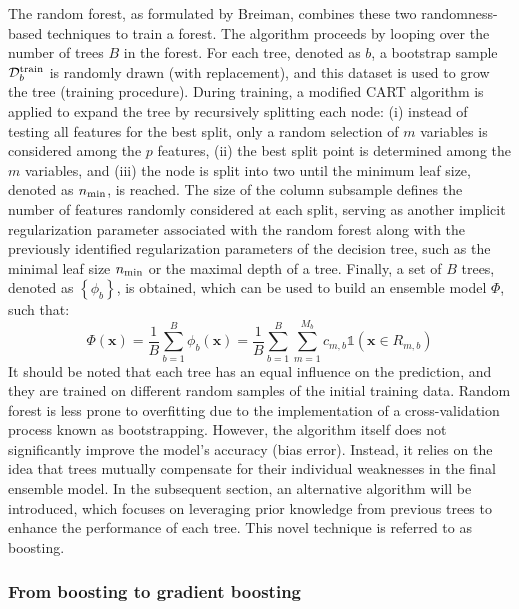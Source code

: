\documentclass[main]{subfiles}
\begin{document}
The random forest, as formulated by Breiman, combines these two randomness-based techniques to train a forest.\autocite{Breiman_2001} The algorithm proceeds by looping over the number of trees $B$ in the forest. For each tree, denoted as $b$, a bootstrap sample $\mathcal{D}^{\text{train}}_b$ is randomly drawn (with replacement), and this dataset is used to grow the tree (training procedure). During training, a modified CART algorithm is applied to expand the tree by recursively splitting each node: (i) instead of testing all features for the best split, only a random selection of $m$ variables is considered among the $p$ features, (ii) the best split point is determined among the $m$ variables, and (iii) the node is split into two until the minimum leaf size, denoted as $n_{\text{min}}$, is reached. The size of the column subsample defines the number of features randomly considered at each split, serving as another implicit regularization parameter associated with the random forest along with the previously identified regularization parameters of the decision tree, such as the minimal leaf size $n_{\text{min}}$ or the maximal depth of a tree. Finally, a set of $B$ trees, denoted as $\left\{\phi_b\right\}$, is obtained, which can be used to build an ensemble model $\Phi$, such that:
\begin{equation}
  \Phi(\mathbf{x}) = \frac{1}{B}\sum_{b=1}^{B} \phi_b(\mathbf{x}) = \frac{1}{B}\sum_{b=1}^{B}\sum_{m=1}^{M_b} c_{m,b} \mathbb{1}(\mathbf{x}\in R_{m,b})
\end{equation}
It should be noted that each tree has an equal influence on the prediction, and they are trained on different random samples of the initial training data. Random forest is less prone to overfitting due to the implementation of a cross-validation process known as bootstrapping. However, the algorithm itself does not significantly improve the model's accuracy (bias error). Instead, it relies on the idea that trees mutually compensate for their individual weaknesses in the final ensemble model. In the subsequent section, an alternative algorithm will be introduced, which focuses on leveraging prior knowledge from previous trees to enhance the performance of each tree. This novel technique is referred to as boosting.

\subsubsection{From boosting to gradient boosting}\label{sct:boosting}
\end{document}
